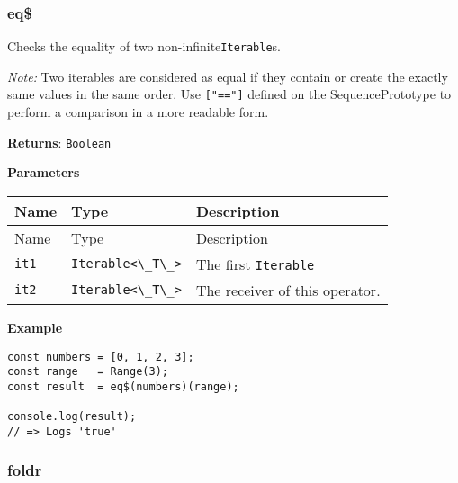 \hypertarget{bd20be56-f445-48bf-bdf2-a716e1236a4d}{%
\subsubsection{eq\$}\label{bd20be56-f445-48bf-bdf2-a716e1236a4d}}

Checks the equality of two
non-infinite\passthrough{\lstinline!Iterable!}s.

\emph{Note:} Two iterables are considered as equal if they contain or
create the exactly same values in the same order. Use
\passthrough{\lstinline!["=="]!} defined on the SequencePrototype to
perform a comparison in a more readable form.

\textbf{Returns}: \passthrough{\lstinline!Boolean!}

\textbf{Parameters}

\begin{longtable}[]{
  >{\raggedright\arraybackslash}p{}
  >{\raggedright\arraybackslash}p{}
  >{\raggedright\arraybackslash}p{}@{}}

\toprule\noalign{}
Name & Type & Description \\
\midrule\noalign{}
\endfirsthead
\toprule\noalign{}
Name & Type & Description \\
\midrule\noalign{}
\endhead
\bottomrule\noalign{}
\endlastfoot
\passthrough{\lstinline!it1!} &
\passthrough{\lstinline!Iterable<\_T\_>!} & The first
\passthrough{\lstinline!Iterable!} \\
\passthrough{\lstinline!it2!} &
\passthrough{\lstinline!Iterable<\_T\_>!} & The receiver of this
operator. \\
\end{longtable}

\textbf{Example}

\begin{lstlisting}[label=b46ef356-2dcb-4c5a-b345-f74828804c55]
const numbers = [0, 1, 2, 3];
const range   = Range(3);
const result  = eq$(numbers)(range);
                                    
console.log(result);
// => Logs 'true'
\end{lstlisting}

\hypertarget{ef923738-324f-424a-8151-1706b42a416d}{%
\subsubsection{foldr}\label{ef923738-324f-424a-8151-1706b42a416d}}

